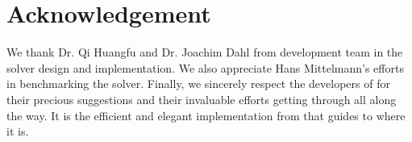 \section{Acknowledgement}

We thank Dr. Qi Huangfu and Dr. Joachim Dahl from  development team \citep{copt} in the solver design and implementation. We also appreciate
Hans Mittelmann's efforts in benchmarking the solver. Finally, we sincerely
respect the developers of  for their precious suggestions
{\cite{benson2008algorithm}} and their invaluable efforts getting
 through all along the way. It is the efficient and elegant
implementation from  that guides  to
where it is.
